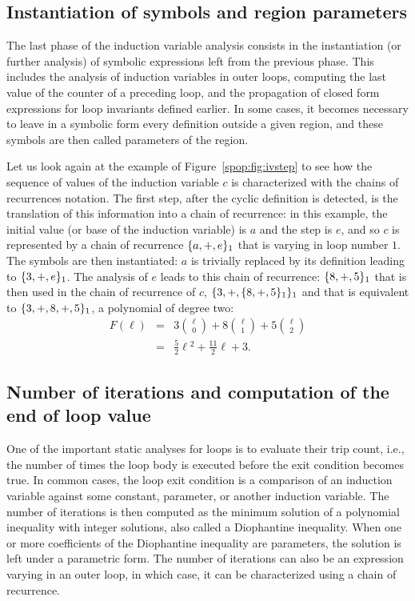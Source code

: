 \subsection{Instantiation of symbols and region parameters}

The last phase of the induction variable analysis consists in the
instantiation (or further analysis) of symbolic expressions left from
the previous phase.  This includes the analysis of induction variables
in outer loops, computing the last value of the counter of a preceding
loop, and the propagation of closed form expressions for loop
invariants defined earlier.  In some cases, it becomes necessary to
leave in a symbolic form every definition outside a given region, and
these symbols are then called parameters of the region.

Let us look again at the example of Figure~\ref{spop:fig:ivstep} to see
how the sequence of values of the induction variable $c$ is
characterized with the chains of recurrences notation.  The first
step, after the cyclic definition is detected, is the translation of
this information into a chain of recurrence: in this example, the
initial value (or base of the induction variable) is $a$ and the
step is $e$, and so $c$ is represented by a chain of recurrence
$\{a, +, e\}_1$ that is varying in loop number $1$.  The symbols
are then instantiated: $a$ is trivially replaced by its definition
leading to $\{3, +, e\}_1$.  The analysis of $e$ leads to this
chain of recurrence: $\{8, +, 5\}_1$ that is then used in the
chain of recurrence of $c$, $\{3, +, \{8, +, 5\}_1\}_1$ and
that is equivalent to $\{3, +, 8, +, 5\}_1$, a polynomial of
degree two:
\begin{eqnarray*}
  F(\ell)
  &=& 3\binom{\ell}{0} + 8\binom{\ell}{1} + 5\binom{\ell}{2} \\
  &=& \frac{5}{2}\ell{}^2+\frac{11}{2}\ell + 3.
\end{eqnarray*}

\subsection{Number of iterations and computation of the end of loop value}

One of the important static analyses for loops is to evaluate their
trip count, i.e., the number of times the loop body is executed before
the exit condition becomes true.  In common cases, the loop exit
condition is a comparison of an induction variable against some
constant, parameter, or another induction variable.  The number of
iterations is then computed as the minimum solution of a polynomial
inequality with integer solutions, also called a Diophantine
inequality.  When one or more coefficients of the Diophantine
inequality are parameters, the solution is left under a parametric
form.  The number of iterations can also be an expression varying in
an outer loop, in which case, it can be characterized using a chain of
recurrence.

